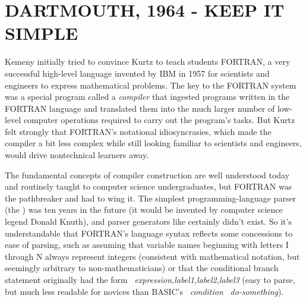 
\section{DARTMOUTH, 1964 - KEEP IT SIMPLE}


Kemeny initially tried to convince Kurtz to teach students FORTRAN, a
very successful high-level language invented by IBM in 1957 for
scientists and engineers to express mathematical problems.
The key to the FORTRAN system was a special program called a
\emph{compiler} that ingested programs written in the FORTRAN language
and translated them into the much larger number of low-level
computer operations required to carry out the program's tasks.
But Kurtz felt strongly that FORTRAN's notational idiosyncrasies, which made
the compiler a bit less complex while still looking familiar to scientists
and engineers, would drive
nontechnical learners away.

\begin{tangent} 
The fundamental concepts of compiler construction are well understood
today and routinely taught to computer science 
undergraduates,
but FORTRAN was the pathbreaker and had to wing it. 
The simplest programming-language
parser (the 
) was ten years in the
future (it would be invented by computer science legend Donald Knuth),
and parser generators like  certainly didn't exist.
So it's understandable that FORTRAN's language syntax
reflects some concessions to ease of parsing, such as assuming that
variable names beginning with letters I through N always represent
integers (consistent with mathematical notation, 
but seemingly arbitrary to non-mathematicians)
or that the conditional branch statement originally had the form
~\emph{expression,label1,label2,label3} (easy
to parse,
but much less readable for novices than BASIC's ~\emph{condition}
~\emph{do-something}).

\end{tangent}

